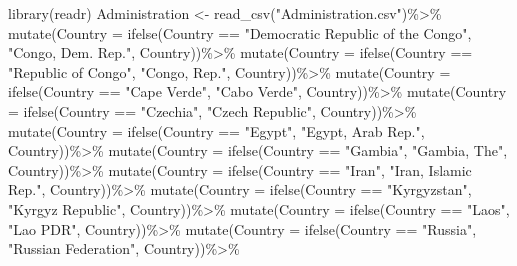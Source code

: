 \documentclass[
]{article}
\newenvironment{Shaded}{\begin{snugshade}}{\end{snugshade}}
\newcommand{\AttributeTok}[1]{\textcolor[rgb]{0.77,0.63,0.00}{#1}}
\newcommand{\FunctionTok}[1]{\textcolor[rgb]{0.00,0.00,0.00}{#1}}
\newcommand{\NormalTok}[1]{#1}
\newcommand{\OtherTok}[1]{\textcolor[rgb]{0.56,0.35,0.01}{#1}}
\newcommand{\SpecialCharTok}[1]{\textcolor[rgb]{0.00,0.00,0.00}{#1}}
\newcommand{\StringTok}[1]{\textcolor[rgb]{0.31,0.60,0.02}{#1}}
\begin{document}
\begin{Shaded}
\begin{Highlighting}[]
\FunctionTok{library}\NormalTok{(readr)}
\NormalTok{Administration }\OtherTok{\textless{}{-}} \FunctionTok{read\_csv}\NormalTok{(}\StringTok{"Administration.csv"}\NormalTok{)}\SpecialCharTok{\%\textgreater{}\%}
\FunctionTok{mutate}\NormalTok{(}\AttributeTok{Country =} \FunctionTok{ifelse}\NormalTok{(Country }\SpecialCharTok{==} \StringTok{"Democratic Republic of the Congo"}\NormalTok{, }\StringTok{"Congo, Dem. Rep."}\NormalTok{, Country))}\SpecialCharTok{\%\textgreater{}\%}
\FunctionTok{mutate}\NormalTok{(}\AttributeTok{Country =} \FunctionTok{ifelse}\NormalTok{(Country }\SpecialCharTok{==} \StringTok{"Republic of Congo"}\NormalTok{, }\StringTok{"Congo, Rep."}\NormalTok{, Country))}\SpecialCharTok{\%\textgreater{}\%}
\FunctionTok{mutate}\NormalTok{(}\AttributeTok{Country =} \FunctionTok{ifelse}\NormalTok{(Country }\SpecialCharTok{==} \StringTok{"Cape Verde"}\NormalTok{, }\StringTok{"Cabo Verde"}\NormalTok{, Country))}\SpecialCharTok{\%\textgreater{}\%}
\FunctionTok{mutate}\NormalTok{(}\AttributeTok{Country =} \FunctionTok{ifelse}\NormalTok{(Country }\SpecialCharTok{==} \StringTok{"Czechia"}\NormalTok{, }\StringTok{"Czech Republic"}\NormalTok{, Country))}\SpecialCharTok{\%\textgreater{}\%}
\FunctionTok{mutate}\NormalTok{(}\AttributeTok{Country =} \FunctionTok{ifelse}\NormalTok{(Country }\SpecialCharTok{==} \StringTok{"Egypt"}\NormalTok{, }\StringTok{"Egypt, Arab Rep."}\NormalTok{, Country))}\SpecialCharTok{\%\textgreater{}\%}
\FunctionTok{mutate}\NormalTok{(}\AttributeTok{Country =} \FunctionTok{ifelse}\NormalTok{(Country }\SpecialCharTok{==} \StringTok{"Gambia"}\NormalTok{, }\StringTok{"Gambia, The"}\NormalTok{, Country))}\SpecialCharTok{\%\textgreater{}\%}
\FunctionTok{mutate}\NormalTok{(}\AttributeTok{Country =} \FunctionTok{ifelse}\NormalTok{(Country }\SpecialCharTok{==} \StringTok{"Iran"}\NormalTok{, }\StringTok{"Iran, Islamic Rep."}\NormalTok{, Country))}\SpecialCharTok{\%\textgreater{}\%}
\FunctionTok{mutate}\NormalTok{(}\AttributeTok{Country =} \FunctionTok{ifelse}\NormalTok{(Country }\SpecialCharTok{==} \StringTok{"Kyrgyzstan"}\NormalTok{, }\StringTok{"Kyrgyz Republic"}\NormalTok{, Country))}\SpecialCharTok{\%\textgreater{}\%}
\FunctionTok{mutate}\NormalTok{(}\AttributeTok{Country =} \FunctionTok{ifelse}\NormalTok{(Country }\SpecialCharTok{==} \StringTok{"Laos"}\NormalTok{, }\StringTok{"Lao PDR"}\NormalTok{, Country))}\SpecialCharTok{\%\textgreater{}\%}
\FunctionTok{mutate}\NormalTok{(}\AttributeTok{Country =} \FunctionTok{ifelse}\NormalTok{(Country }\SpecialCharTok{==} \StringTok{"Russia"}\NormalTok{, }\StringTok{"Russian Federation"}\NormalTok{, Country))}\SpecialCharTok{\%\textgreater{}\%}

\end{Highlighting}
\end{Shaded}
\end{document}
